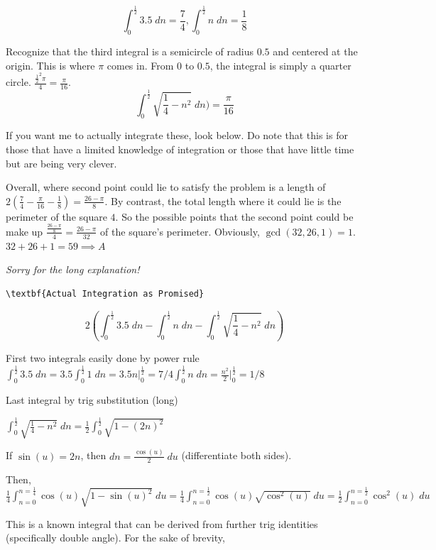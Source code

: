 \begin{enumerate}
 
 \[\int_{0}^{\frac{1}{2}} 3.5\;dn=\frac{7}{4}, \int_{0}^{\frac{1}{2}}n\;dn=\frac{1}{8}\]

 Recognize that the third integral is a semicircle of radius $0.5$ and centered at the origin. This is where $\pi$ comes in. From $0$ to $0.5$, the integral is simply a quarter circle. $\frac{\frac{1}{2}^2\pi}{4}=\frac{\pi}{16}$.
 \[\int_{0}^{\frac{1}{2}}\sqrt{\frac{1}{4}-n^2}\;dn)=\frac{\pi}{16}\]

 If you want me to actually integrate these, look below. Do note that this is for those that have a limited knowledge of integration or those that have little time but are being very clever.

 Overall, where second point could lie to satisfy the problem is a length of $2(\frac{7}{4}-\frac{\pi}{16}-\frac{1}{8})=\frac{26-\pi}{8}$. By contrast, the total length where it could lie is the perimeter of the square $4$. So the possible points that the second point could be make up $\frac{\frac{26-\pi}{8}}{4}=\frac{26-\pi}{32}$ of the square's perimeter. Obviously, $\gcd(32, 26, 1)=1$. $32+26+1=59\implies\boxed{A}$

 \textit{Sorry for the long explanation!}

 \begin{verbatim}
\textbf{Actual Integration as Promised}
\end{verbatim}


 \[2(\int_{0}^{\frac{1}{2}} 3.5\;dn -\int_{0}^{\frac{1}{2}}n\;dn -\int_{0}^{\frac{1}{2}}\sqrt{\frac{1}{4}-n^2}\;dn)\]

 First two integrals easily done by power rule$\int_{0}^{\frac{1}{2}} 3.5\;dn=3.5\int_{0}^{\frac{1}{2}} 1\;dn=3.5n\Big|_0^{\frac{1}{2}}=7/4$$\int_{0}^{\frac{1}{2}}n\;dn= \frac{n^2}{2}\Big|_0^{\frac{1}{2}}=1/8$

 
Last integral by trig substitution (long)

 $\int_{0}^{\frac{1}{2}}\sqrt{\frac{1}{4}-n^2}\;dn=\frac{1}{2}\int_{0}^{\frac{1}{2}}\sqrt{1-(2n)^2}$

 If $\sin(u)=2n$, then $dn=\frac{\cos(u)}{2}\;du$ (differentiate both sides). 

 Then, $\frac{1}{4}\int_{n=0}^{n=\frac{1}{4}}\cos(u)\sqrt{1-\sin(u)^2}\;du=\frac{1}{4}\int_{n=0}^{n=\frac{1}{2}}\cos(u)\sqrt{\cos^2(u)}\;du=\frac{1}{2}\int_{n=0}^{n=\frac{1}{2}}\cos^2(u)\;du$

 This is a known integral that can be derived from further trig identities (specifically double angle). For the sake of brevity,  


\end{enumerate}
